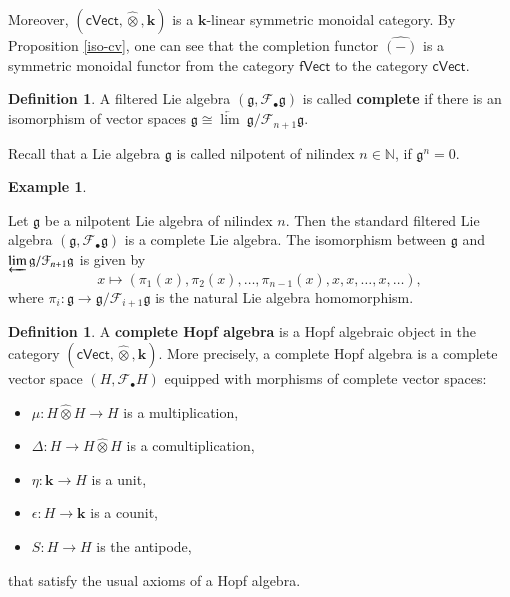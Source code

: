 \documentclass[12pt]{amsart}
\theoremstyle{definition}   %
\newtheorem{defi}[thm]{Definition}
\newtheorem{ex}[thm]{Example}
\newcommand{\bk}{{\mathbf{k}}}
\newcommand{\g}{\mathfrak g}
\newcommand{\huaF}{\mathcal{F}}
\newcommand{\fVec}{\mathsf{fVect}}
\newcommand{\cVec}{\mathsf{cVect}}
\begin{document}
Moreover,  $(\cVec,\hat{\otimes},\bk)$ is a $\bk$-linear symmetric monoidal category. By Proposition \ref{iso-cv},  one can see that the completion functor $\widehat{(-)}$ is a  symmetric monoidal functor from the  category $\fVec$ to the  category $\cVec$. %


\begin{defi}
A filtered Lie algebra $(\g, \huaF_{\bullet}\g)$ is called {\bf complete} if there is an isomorphism of vector spaces
	$
	\g\cong\underleftarrow{\lim}~\g/\huaF_{n+1}\g
	$.
\end{defi}

Recall that
    a Lie algebra $\g$ is called nilpotent of nilindex $n\in \mathbb N$, if $\g^n=0$.


\begin{ex}\label{nilp}

Let $\g$ be a nilpotent Lie algebra of nilindex $n$.
Then the standard filtered Lie algebra $(\g,\huaF_{\bullet} \g)$ is a complete Lie algebra. The isomorphism between $\g$ and $\varprojlim \g/\huaF_{n+1}\g$  is given by
\begin{equation}\label{corresp}
x\mapsto (\pi_1(x),\pi_2(x), \ldots, \pi_{n-1}(x),x,x,\ldots,x,\ldots),
\end{equation}
where $\pi_i:\g\rightarrow \g/\huaF_{i+1}\g$ is the natural Lie algebra homomorphism.
\end{ex}



\begin{defi}
    A {\bf complete Hopf algebra} is a Hopf algebraic object in the category $(\cVec,\hat{\otimes}, \bk)$. More precisely, a complete Hopf algebra is a complete vector space $(H,\huaF_{\bullet}H)$ equipped with morphisms of complete vector spaces:
    \begin{itemize}
    \item $\mu: H\hat{\otimes} H\longrightarrow H$ is a multiplication,
     \item $\Delta: H\longrightarrow H\hat{\otimes} H$ is a comultiplication,
     \item $\eta: \bk\longrightarrow H$ is a unit,
     \item $\epsilon: H\longrightarrow \bk$ is a counit,
     \item $S: H\longrightarrow H$ is the antipode,
\end{itemize}
that satisfy the usual axioms of a Hopf algebra.
\end{defi}
\end{document}
